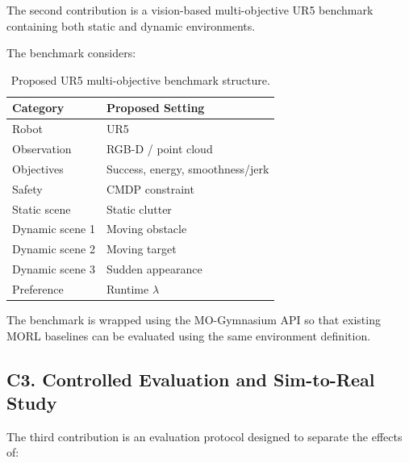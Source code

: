 \documentclass[journal]{IEEEtran}
\begin{document}
The second contribution is a vision-based multi-objective UR5
benchmark containing both static and dynamic environments.

The benchmark considers:

\begin{table}[t]
\centering
\caption{Proposed UR5 multi-objective benchmark structure.}
\label{tab:benchmark}

\renewcommand{\arraystretch}{1.2}

\begin{tabular}{l l}
\toprule
\textbf{Category} & \textbf{Proposed Setting} \\
\midrule

Robot & UR5 \\

Observation & RGB-D / point cloud \\

Objectives & Success, energy, smoothness/jerk \\

Safety & CMDP constraint \\

Static scene & Static clutter \\

Dynamic scene 1 & Moving obstacle \\

Dynamic scene 2 & Moving target \\

Dynamic scene 3 & Sudden appearance \\

Preference & Runtime $\lambda$ \\

\bottomrule
\end{tabular}
\end{table}

The benchmark is wrapped using the MO-Gymnasium API so that existing
MORL baselines can be evaluated using the same environment definition.


\subsection*{C3. Controlled Evaluation and Sim-to-Real Study}

The third contribution is an evaluation protocol designed to separate
the effects of:
\end{document}
